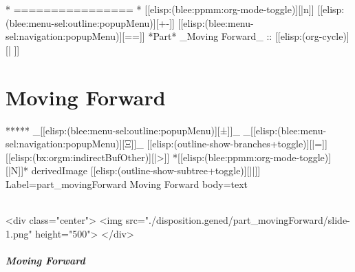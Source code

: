 \begin{whenOrg}
\begin{verblatex}
\begin{frame}[fragile,plain,label=lcntBleePanelsVideo]
{}

\end{frame}
\end{verblatex}


\begin{whenOrg}
*      ================
*  [[elisp:(blee:ppmm:org-mode-toggle)][|n]] [[elisp:(blee:menu-sel:outline:popupMenu)][+-]] [[elisp:(blee:menu-sel:navigation:popupMenu)][==]]  *Part*   _Moving Forward_ ::  [[elisp:(org-cycle)][| ]]
\end{whenOrg}

\newpage
\part{Moving Forward}


\begin{whenOrg}
*****  _[[elisp:(blee:menu-sel:outline:popupMenu)][±]]_ _[[elisp:(blee:menu-sel:navigation:popupMenu)][Ξ]]_ [[elisp:(outline-show-branches+toggle)][|=]] [[elisp:(bx:orgm:indirectBufOther)][|>]] *[[elisp:(blee:ppmm:org-mode-toggle)][|N]]*  derivedImage [[elisp:(outline-show-subtree+toggle)][||]] Label=part_movingForward Moving Forward body=text
\end{whenOrg}

\begin{htmlonly}

\begin{frame}[fragile,plain,label=part_movingForward]
    \frametitle{}
    \framesubtitle{}
    \begin{rawhtml}
<div class="center">
<img src="./disposition.gened/part_movingForward/slide-1.png" height="500">
</div>
    \end{rawhtml}
\end{frame}
\end{htmlonly}

\begin{verblatex}

\begin{frame}[fragile,label=part_movingForward]
    \frametitle{Moving Forward}
    \framesubtitle{}


\end{frame}
\end{verblatex}
\end{whenOrg}
